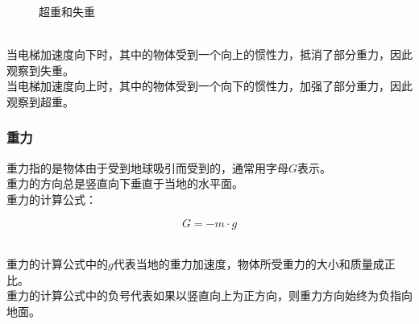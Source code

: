 \documentclass[UTF8]{ctexart}
\begin{document}
\begin{figure}[h]
\begin{center}
{
            }
            \caption{超重和失重}
        \end{center}
    \end{figure}\\
    当电梯加速度向下时，其中的物体受到一个向上的惯性力，抵消了部分重力，因此观察到失重。\\[3mm]
    当电梯加速度向上时，其中的物体受到一个向下的惯性力，加强了部分重力，因此观察到超重。

\newpage

\subsubsection{重力}
    重力指的是物体由于受到地球吸引而受到的，通常用字母$G$表示。\\[3mm]
    重力的方向总是竖直向下垂直于当地的水平面。\\[3mm]
    重力的计算公式：
    \begin{large}
        \begin{equation*}
            G=-m\cdot g
        \end{equation*}
    \end{large}\\
    重力的计算公式中的$g$代表当地的重力加速度，物体所受重力的大小和质量成正比。\\[3mm]
    重力的计算公式中的负号代表如果以竖直向上为正方向，则重力方向始终为负指向地面。
\end{document}
